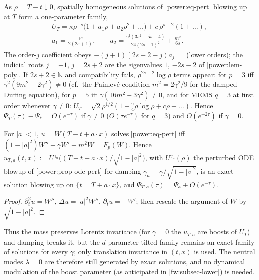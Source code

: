 \begin{proposition}\label{power:prop-ode-pert}
As $\rho=T-t\downarrow0$, spatially homogeneous solutions of \eqref{power:eq-pert}
blowing up at $T$ form a one-parameter family,
\begin{gather*}
  U_T=\kappa\rho^{-s}\bigl(1+a_1\rho+a_2\rho^2+\dots\bigr)+c\,\rho^{s+2}(1+\dots),\\
  a_1=\frac{\gamma s}{2(2s+1)},\qquad
  a_2=\frac{\gamma^2(3s^2-5s-4)}{24(2s+1)^2}+\frac{m^2}{6s}.
\end{gather*}
The order-$j$ coefficient obeys $-(j+1)(2s+2-j)a_j=$ (lower orders); the indicial
roots $j=-1$, $j=2s+2$ are the eigenvalues $1$, $-2s-2$ of \cref{power:lem-poly}. If
$2s+2\in\mathbb N$ and compatibility fails, $\rho^{2s+2}\log\rho$ terms appear: for
$p=3$ iff $\gamma^2(9m^2-2\gamma^2)\neq0$ (cf.\ the Painlevé condition $m^2=2\gamma^2/9$
for the damped Duffing equation), for $p=5$ iff $\gamma(16m^2-3\gamma^2)\neq0$, and
for MEMS $q=3$ at first order whenever $\gamma\ne0$:
$U_T=\sqrt2\rho^{1/2}(1+\frac\gamma4\rho\log\rho+c\rho+\dots)$. Hence
$\Psi_T(\tau)-\Psi_*=O(e^{-\tau})$ if $\gamma\neq0$ ($O(\tau e^{-\tau})$ for $q=3$) and
$O(e^{-2\tau})$ if $\gamma=0$.
\end{proposition}

\begin{lemma}\label{power:lem-tilt}
For $|a|<1$, $u=W(T-t+a\cdot x)$ solves \eqref{power:eq-pert} iff
$(1-|a|^2)W''-\gamma W'+m^2W=F_p(W)$. Hence
$u_{T,a}(t,x):=U^{\gamma_a}\bigl((T-t+a\cdot x)/\sqrt{1-|a|^2}\bigr)$, with $U^{\gamma_a}(\rho)$ the
perturbed ODE blowup of \cref{power:prop-ode-pert} for damping
$\gamma_a=\gamma/\sqrt{1-|a|^2}$, is an exact solution blowing up on
$\{t=T+a\cdot x\}$, and $\Psi_{T,a}(\tau)=\Psi_a+O(e^{-\tau})$.
\end{lemma}
\begin{proof}
$\partial_t^2u=W''$, $\Delta u=|a|^2W''$, $\partial_tu=-W'$; then rescale the
argument of $W$ by $\sqrt{1-|a|^2}$.
\end{proof}

Thus the mass preserves Lorentz invariance (for $\gamma=0$ the $u_{T,a}$ are
boosts of $U_T$) and damping breaks it, but the $d$-parameter tilted family
remains an exact family of solutions for every $\gamma$; only translation
invariance in $(t,x)$ is used. The neutral modes $\lambda=0$ are therefore still
generated by exact solutions, and no dynamical modulation of the boost
parameter (as anticipated in \cref{fw:subsec-lower}) is needed.

